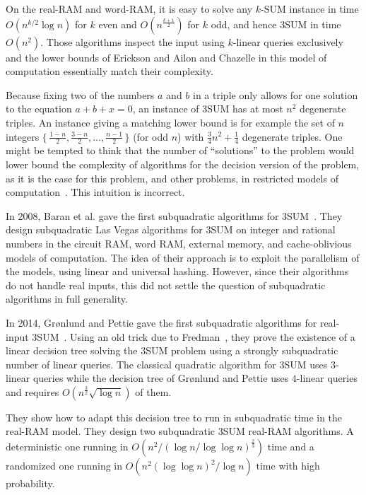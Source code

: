 On the real-RAM and word-RAM,
it is easy to solve any \(k\)-SUM instance in time \(O(n^{k/2} \log n)\) for
\(k\) even and \(O(n^{\frac{k+1}{2}})\) for \(k\) odd,
and hence 3SUM in time \(O(n^2)\). Those algorithms inspect the input using
\(k\)-linear queries exclusively and the lower bounds of Erickson and Ailon and
Chazelle in this model of computation essentially match their complexity.

Because fixing two of the numbers $a$ and $b$ in a triple only allows for one
solution to the equation $a + b + x = 0$, an instance of 3SUM has at most
$n^2$ degenerate triples. An instance giving a matching lower bound is for
example the set
of \(n\) integers
$\{\,\frac{1-n}{2},\frac{3-n}{2},\ldots,\frac{n-1}{2}\,\}$ (for odd $n$)
with $\frac{3}{4} n^2 + \frac 14$ degenerate triples.
%
One might be tempted to think that the number of ``solutions'' to the problem
would lower bound the complexity of algorithms for the decision version of the
problem, as it is the case for this problem, and other problems, in restricted
models of computation~\cite{Er96,Er99a}.
%
This intuition is incorrect.

In 2008, Baran et al. gave the first subquadratic algorithms for
3SUM~\cite{BDP08}. They design subquadratic Las Vegas
algorithms for 3SUM on integer and
rational numbers in the circuit RAM, word RAM, external memory, and
cache-oblivious models of computation. The idea of their approach is to exploit
the parallelism of the models, using linear and universal hashing. However,
since their algorithms do not handle real inputs,
this did not settle the question of subquadratic algorithms in full
generality.

In 2014, Gr{\o}nlund and Pettie gave
the first subquadratic algorithms for real-input 3SUM~\cite{GP18}.
Using an old trick due to Fredman~\cite{Fr76},
they prove the existence of a linear decision tree
solving the 3SUM problem using a strongly subquadratic number of linear queries.
The classical quadratic algorithm for 3SUM uses \(3\)-linear queries
while the decision tree of Gr{\o}nlund and Pettie uses \(4\)-linear queries and
requires $O(n^{\frac{3}{2}} \sqrt{\log n})$ of them.


They show how to adapt this decision tree to run in subquadratic time in the
real-RAM model. They design two subquadratic 3SUM
real-RAM algorithms. A deterministic one running in
$O(n^2/{(\log n/\log \log n)}^{\frac{2}{3}})$
time and a randomized one running in
$O(n^2 {(\log \log n)}^2 / \log n)$ time with high probability.

